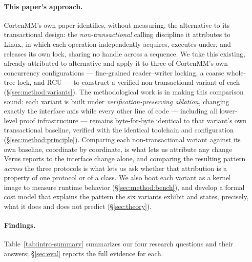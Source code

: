 \documentclass[10pt]{article}
\begin{document}
\paragraph{This paper's approach.} CortenMM's own paper identifies,
without measuring, the alternative to its transactional design: the
\emph{non-transactional} calling discipline it attributes to Linux, in
which each operation independently acquires, executes under, and
releases its own lock, sharing no handle across a sequence. We take
this existing, already-attributed-to alternative and apply it to three
of CortenMM's own concurrency configurations --- fine-grained
reader--writer locking, a coarse whole-tree lock, and RCU --- to
construct a verified non-transactional variant of each
(\S\ref{sec:method:variants}). The methodological work is in making
this comparison sound: each variant is built under
\emph{verification-preserving ablation}, changing exactly the interface
axis while every other line of code --- including all lower-level
proof infrastructure --- remains byte-for-byte identical to that
variant's own transactional baseline, verified with the identical
toolchain and configuration (\S\ref{sec:method:principle}). Comparing
each non-transactional variant against its own baseline, coordinate by
coordinate, is what lets us attribute any change Verus reports to the
interface change alone, and comparing the resulting pattern
\emph{across} the three protocols is what lets us ask whether that
attribution is a property of one protocol or of a class. We also boot
each variant as a kernel image to measure runtime behavior
(\S\ref{sec:method:bench}), and develop a formal cost model that
explains the pattern the six variants exhibit and states, precisely,
what it does and does not predict (\S\ref{sec:theory}).

\paragraph{Findings.} Table~\ref{tab:intro-summary} summarizes our four
research questions and their answers; \S\ref{sec:eval} reports the full
evidence for each.
\end{document}
